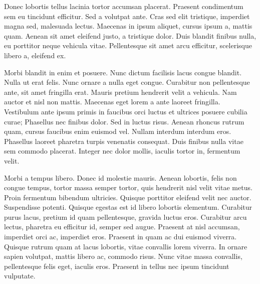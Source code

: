 Donec lobortis tellus lacinia tortor accumsan placerat. Praesent condimentum sem eu tincidunt efficitur. Sed a volutpat ante. Cras sed elit tristique, imperdiet magna sed, malesuada lectus. Maecenas in ipsum aliquet, cursus ipsum a, mattis quam. Aenean sit amet eleifend justo, a tristique dolor. Duis blandit finibus nulla, eu porttitor neque vehicula vitae. Pellentesque sit amet arcu efficitur, scelerisque libero a, eleifend ex.

Morbi blandit in enim et posuere. Nunc dictum facilisis lacus congue blandit. Nulla ut erat felis. Nunc ornare a nulla eget congue. Curabitur non pellentesque ante, sit amet fringilla erat. Mauris pretium hendrerit velit a vehicula. Nam auctor et nisl non mattis. Maecenas eget lorem a ante laoreet fringilla. Vestibulum ante ipsum primis in faucibus orci luctus et ultrices posuere cubilia curae; Phasellus nec finibus dolor. Sed in luctus risus. Aenean rhoncus rutrum quam, cursus faucibus enim euismod vel. Nullam interdum interdum eros. Phasellus laoreet pharetra turpis venenatis consequat. Duis finibus nulla vitae sem commodo placerat. Integer nec dolor mollis, iaculis tortor in, fermentum velit.

Morbi a tempus libero. Donec id molestie mauris. Aenean lobortis, felis non congue tempus, tortor massa semper tortor, quis hendrerit nisl velit vitae metus. Proin fermentum bibendum ultricies. Quisque porttitor eleifend velit nec auctor. Suspendisse potenti. Quisque egestas est id libero lobortis elementum. Curabitur purus lacus, pretium id quam pellentesque, gravida luctus eros. Curabitur arcu lectus, pharetra eu efficitur id, semper sed augue. Praesent at nisl accumsan, imperdiet orci ac, imperdiet eros. Praesent in quam ac dui euismod viverra. Quisque rutrum quam at lacus lobortis, vitae convallis lorem viverra. In ornare sapien volutpat, mattis libero ac, commodo risus. Nunc vitae massa convallis, pellentesque felis eget, iaculis eros. Praesent in tellus nec ipsum tincidunt vulputate.

